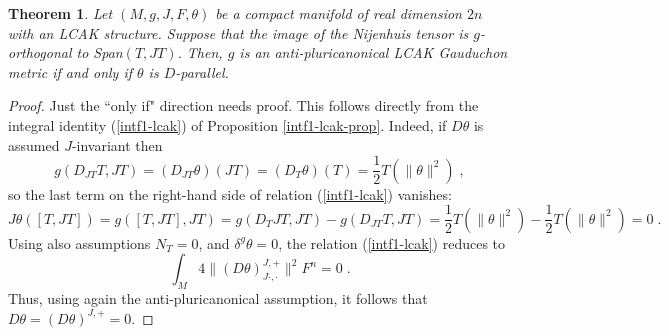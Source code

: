 \documentclass[a4paper,11pt]{amsart}
\newtheorem{thm}{Theorem}
\theoremstyle{definition}
\renewcommand{\[}{\begin{equation*}}
\renewcommand{\]}{\end{equation*}}
\begin{document}
 \begin{thm}\label{anti-pluricanonical}
 Let $(M, g, J, F, \theta)$ be a compact manifold of real dimension $2n$ with an LCAK structure.
 Suppose that the image of the Nijenhuis tensor is $g$-orthogonal to Span$(T,JT)$.
 Then, $g$ is an anti-pluricanonical LCAK Gauduchon metric if and only if $\theta$ is $D$-parallel.
 \end{thm}
 \begin{proof} Just the ``only if" direction needs proof. This follows directly from the integral identity (\ref{intf1-lcak}) of Proposition \ref{intf1-lcak-prop}. Indeed, if $D \theta$ is assumed $J$-invariant then
 $$ g(D_{JT} T, JT) = (D_{JT} \theta)(JT) = (D_{T} \theta)(T) = \frac{1}{2} T(\| \theta \|^2) \; ,$$
 so the last term on the right-hand side of relation (\ref{intf1-lcak}) vanishes:
 $$ J\theta([T,JT]) = g([T,JT], JT) = g(D_T JT, JT) - g(D_{JT} T, JT) = \frac{1}{2} T(\| \theta \|^2) - \frac{1}{2} T(\| \theta \|^2) = 0 \; .$$
 Using also assumptions $N_T = 0$, and $\delta^g \theta = 0$, the relation (\ref{intf1-lcak}) reduces to 
 $$ \int_M 4 \| (D \theta)^{J,+}_{J\cdot, \cdot} \|^2 F^n = 0 \; .$$
 Thus, using again the anti-pluricanonical assumption, it follows  that
 $ D \theta = (D \theta)^{J,+} = 0 $.
 \end{proof}
 
\end{document}
